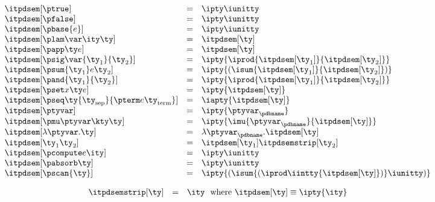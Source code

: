 \fbox{$\itpdsem[\ty] = \ity$}
\[ 
\begin{array}{lcl} 
\itpdsem[\ptrue] & = & \ipty \iunitty \\                                                  
\itpdsem[\pfalse] & = & \ipty \iunitty \\                                                  
\itpdsem[\pbase{e}] & = & \ipty \iunitty\\
\itpdsem[\plam \var \ity \ty] & = & \itpdsem[\ty] \\
\itpdsem[\papp \ty e] & = & \itpdsem[\ty] \\
\itpdsem[\psig \var {\ty_1} {\ty_2}] & = & 
               \ipty {\iprod {\itpdsem[\ty_1]} {\itpdsem[\ty_2]}} \\
\itpdsem[\psum {\ty_1} e {\ty_2}] & = & 
               \ipty {(\isum {\itpdsem[\ty_1]} {\itpdsem[\ty_2]})} \\
\itpdsem[\pand {\ty_1} {\ty_2}] & = & \ipty {\iprod {\itpdsem[\ty_1]} {\itpdsem[\ty_2]}}    \\
\itpdsem[\pset x \ty e] & = & \ipty {\itpdsem[\ty]} \\
\itpdsem[\pseq \ty {\ty_{\text{sep}}} {\pterm e {\ty_{\text{term}}}}] & = & 
  \iapty {\itpdsem[\ty]} \\
\itpdsem[\ptyvar] & = & \ipty{\ptyvar_\pdbname} \\
\itpdsem[\pmu \ptyvar \kty \ty] & = & 
  \ipty{\imu{\ptyvar_\pdbname}{\itpdsem[\ty]}} \\
\itpdsem[\lambda \ptyvar.\ty]      
     & = & \lambda \ptyvar_\pdbname.\itpdsem[\ty] \\
\itpdsem[\ty_1 \ty_2]            & = & \itpdsem[\ty_1] \itpdsemstrip[\ty_2] \\
\itpdsem[\pcompute e \ity]            & = & \ipty \iunitty \\
\itpdsem[\pabsorb \ty]                & = & \ipty \iunitty \\
\itpdsem[\pscan{\ty}] & = & \ipty {(\isum {(\iprod \iintty
    {\itpdsem[\ty]})} \iunitty)}
\end{array}
\]

\fbox{$\itpdsemstrip[\ty] = \ity$}

\[
\begin{array}{lcl} 
\itpdsemstrip[\ty] & = & \ity \ \ \mbox{where}\ \itpdsem[\ty] \equiv \ipty{\ity}
\end{array}
\]

